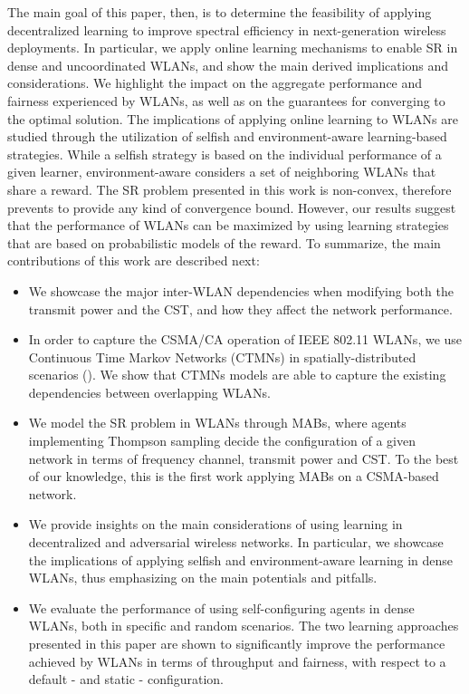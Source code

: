 \documentclass{article}
\begin{document}
The main goal of this paper, then, is to determine the feasibility of applying decentralized learning to improve spectral efficiency in next-generation wireless deployments. In particular, we apply online learning mechanisms to enable SR in dense and uncoordinated WLANs, and show the main derived implications and considerations. We highlight the impact on the aggregate performance and fairness experienced by WLANs, as well as on the guarantees for converging to the optimal solution. The implications of applying online learning to WLANs are studied through the utilization of selfish and environment-aware learning-based strategies. While a selfish strategy is based on the individual performance of a given learner, environment-aware considers a set of neighboring WLANs that share a reward. The SR problem presented in this work is non-convex, therefore prevents to provide any kind of convergence bound. However, our results suggest that the performance of WLANs can be maximized by using learning strategies that are based on probabilistic models of the reward. To summarize, the main contributions of this work are described next:
\begin{itemize}
	\item We showcase the major inter-WLAN dependencies when modifying both the transmit power and the CST, and how they affect the network performance.
	\item In order to capture the CSMA/CA operation of IEEE 802.11 WLANs, we use Continuous Time Markov Networks (CTMNs) in spatially-distributed scenarios (\citealp{bellalta2017throughput}). We show that CTMNs models are able to capture the existing dependencies between overlapping WLANs. 	
	\item We model the SR problem in WLANs through MABs, where agents implementing Thompson sampling decide the configuration of a given network in terms of frequency channel, transmit power and CST. To the best of our knowledge, this is the first work applying MABs on a CSMA-based network.
	\item We provide insights on the main considerations of using learning in decentralized and adversarial wireless networks. In particular, we showcase the implications of applying selfish and environment-aware learning in dense WLANs, thus emphasizing on the main potentials and pitfalls.
	\item We evaluate the performance of using self-configuring agents in dense WLANs, both in specific and random scenarios. The two learning approaches presented in this paper are shown to significantly improve the performance achieved by WLANs in terms of throughput and fairness, with respect to a default - and static - configuration.
\end{itemize}		
\end{document}
